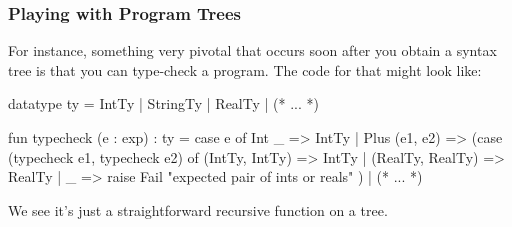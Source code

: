 \documentclass[aspectratio=169, handout]{beamer}
\begin{document}
\begin{frame}[fragile]
  \frametitle{Playing with Program Trees}

  \tgs

  For instance, something very pivotal that occurs soon after you obtain
  a syntax tree is that you can type-check a program. The code for that
  might look like:

  \pause
  {\small
  \begin{codeblock}
    datatype ty = IntTy | StringTy | RealTy | (* ... *)

    fun typecheck (e : exp) : ty =
      case e of
        Int _ => IntTy
      | Plus (e1, e2) =>
          (case (typecheck e1, typecheck e2) of
            (IntTy, IntTy) => IntTy
          | (RealTy, RealTy) => RealTy
          | _ => raise Fail "expected pair of ints or reals"
          )
      | (* ... *)
  \end{codeblock}
  }

  \pause
  \vspace{\fill}

  We see it's just a straightforward recursive function on a tree.
\end{frame}
\end{document}
